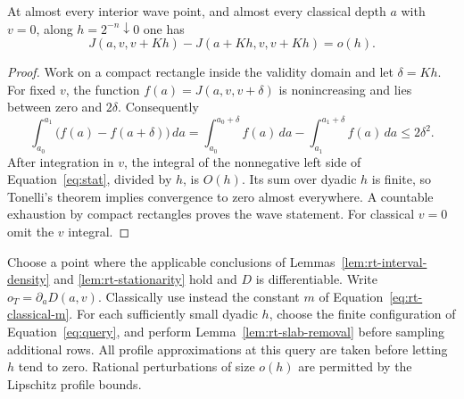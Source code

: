 \begin{lemma}\label{lem:rt-stationarity}
At almost every interior wave point, and almost every classical
depth $a$ with $v=0$, along $h=2^{-n}\downarrow0$ one has
\begin{equation}
 J(a,v,v+Kh)-J(a+Kh,v,v+Kh)=o(h).
 \tag{stat}\label{eq:stat}
\end{equation}
\end{lemma}

\begin{proof}
Work on a compact rectangle inside the validity domain and let
$\delta=Kh$.  For fixed $v$, the function
$f(a)=J(a,v,v+\delta)$ is nonincreasing and lies between zero
and $2\delta$.  Consequently
\[
 \int_{a_0}^{a_1}\bigl(f(a)-f(a+\delta)\bigr)\,da
 =\int_{a_0}^{a_0+\delta}f(a)\,da
  -\int_{a_1}^{a_1+\delta}f(a)\,da
 \le2\delta^2.
\]
After integration in $v$, the integral of the nonnegative
left side of Equation~\eqref{eq:stat}, divided by $h$, is
$O(h)$.  Its sum over dyadic $h$ is finite, so Tonelli's theorem
implies convergence to zero almost everywhere.  A countable
exhaustion by compact rectangles proves the wave statement.
For classical $v=0$ omit the $v$ integral.
\end{proof}

Choose a point where the applicable conclusions of
Lemmas~\ref{lem:rt-interval-density} and
\ref{lem:rt-stationarity} hold and $D$ is differentiable.
Write $o_T=\partial_aD(a,v)$.  Classically use instead the constant
$m$ of Equation~\eqref{eq:rt-classical-m}.
For each sufficiently small dyadic $h$, choose the finite
configuration of Equation~\eqref{eq:query}, and perform
Lemma~\ref{lem:rt-slab-removal} before sampling additional rows.
All profile approximations at this query are taken before letting
$h$ tend to zero.  Rational perturbations of size $o(h)$ are
permitted by the Lipschitz profile bounds.

